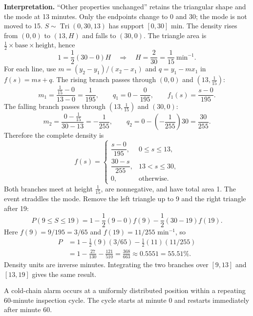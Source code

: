 \textbf{Interpretation.} ``Other properties unchanged'' retains the triangular shape and the mode at 13 minutes. Only the endpoints change to 0 and 30; the mode is not moved to 15.
$S\sim\operatorname{Tri}(0,30,13)$ has support $[0,30]$ min. The density rises from $(0,0)$ to $(13,H)$ and falls to $(30,0)$.
The triangle area is $\tfrac12\times\text{base}\times\text{height}$, hence
\[1=\frac12(30-0)H\quad\Longrightarrow\quad H=\frac2{30}=\frac1{15}\ \mathrm{min}^{-1}.\]
For each line, use $m=(y_2-y_1)/(x_2-x_1)$ and $q=y_1-mx_1$ in $f(s)=ms+q$.
The rising branch passes through $(0,0)$ and $(13,\frac1{15})$:
\[m_1=\frac{\frac1{15}-0}{13-0}=\frac1{195},\qquad q_1=0-\frac{0}{195},\qquad f_1(s)=\frac{s-0}{195}.\]
The falling branch passes through $(13,\frac1{15})$ and $(30,0)$:
\[m_2=\frac{0-\frac1{15}}{30-13}=-\frac1{255},\qquad q_2=0-\left(-\frac1{255}\right)30=\frac{30}{255}.\]
Therefore the complete density is
\[f(s)=\begin{cases}\dfrac{s-0}{195},&0\le s\le13,\\[1mm]
\dfrac{30-s}{255},&13<s\le 30,\\[1mm]0,&\text{otherwise}.\end{cases}\]
Both branches meet at height $\frac1{15}$, are nonnegative, and have total area 1.
\Needspace{11cm}
The event straddles the mode. Remove the left triangle up to 9 and the right triangle after 19:
\[P(9\le S\le19)=1-\frac12(9-0)f(9)-\frac12(30-19)f(19).\]
Here $f(9)=9/195=3/65$ and $f(19)=11/255$ min$^{-1}$, so
\[\begin{aligned}P&=1-\tfrac12(9)(3/65)-\tfrac12(11)(11/255)\\
&=1-\frac{27}{130}-\frac{121}{510}=\boxed{\frac{368}{663}\approx0.5551=55.51\%}.\end{aligned}\]
Density units are inverse minutes. Integrating the two branches over $[9,13]$ and $[13,19]$ gives the same result.

\clearpage\def\CurrentProblem{cycle}
A cold-chain alarm occurs at a uniformly distributed position within a repeating 60-minute inspection cycle. The cycle starts at minute 0 and restarts immediately after minute 60.

